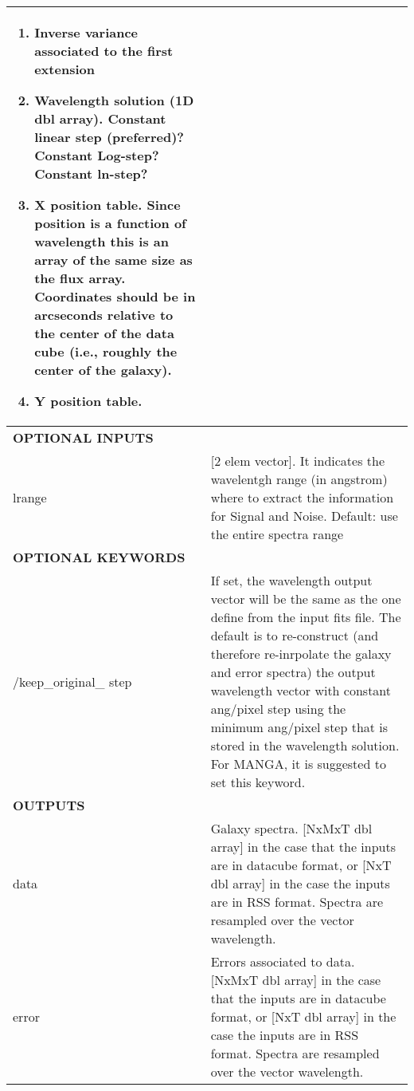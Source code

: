 \begin{center}
\begin{longtable}{p{2.7cm}| p{11.1cm}}
\begin{enumerate}
                            \item Inverse variance associated to the first extension

                            \item Wavelength solution (1D dbl array). Constant linear step
                              (preferred)? Constant Log-step? Constant ln-step?
                            
                            \item X position table.  Since position is a function of wavelength this is an 
                               array of the same size as the flux array.  Coordinates should be in arcseconds 
                               relative to the center of the data cube (i.e., roughly the center of the galaxy).
                            \item Y position table.
                            \end{enumerate}\\
%
\hline
{\bf  OPTIONAL INPUTS}  & \\
\hline
lrange & [2 elem vector]. It indicates the wavelentgh range (in angstrom) where to
       extract the information for Signal and Noise. Default: use the entire
spectra range \\
%
\hline {\bf OPTIONAL KEYWORDS} &  \\ 
\hline 
/keep\_original\_ step & If set, the wavelength output vector will be the same as the one
                         define from the input fits file. The default
                         is to re-construct (and  therefore re-inrpolate the galaxy and error
                         spectra) the output wavelength vector with constant ang/pixel step
                         using the minimum ang/pixel step that is stored in the wavelength
                         solution. For MANGA, it is suggested to set this keyword.\\
%
\hline
{\bf  OUTPUTS} &  \\
\hline
data           &  Galaxy spectra. [NxMxT dbl array] in the case that the inputs are in datacube format, or [NxT dbl array]
               in the case the inputs are in RSS format. Spectra are resampled over the vector wavelength.    \\
%
error          & Errors associated to data. [NxMxT dbl array] in the case that the inputs are in datacube format, or [NxT dbl array]
               in the case the inputs are in RSS format. Spectra are resampled over the vector wavelength. \\

\end{longtable}
\end{center}
